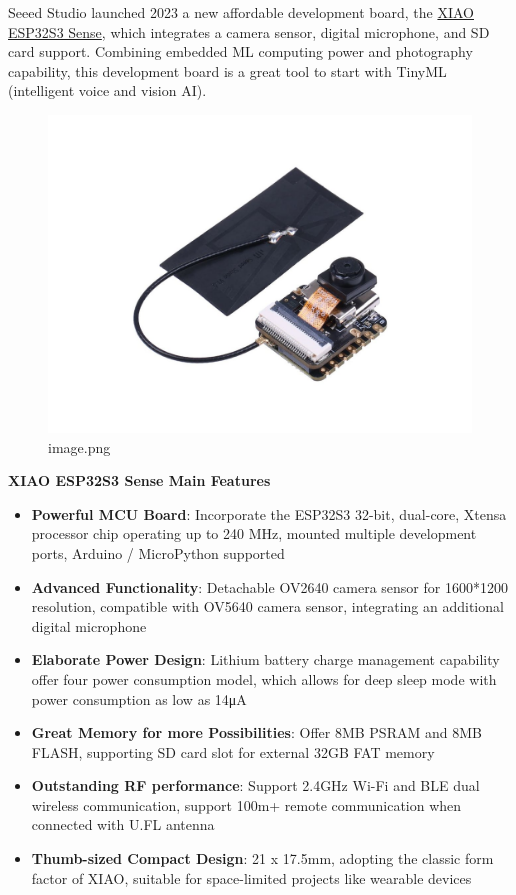 \documentclass[
  letterpaper,
  DIV=11,
  numbers=noendperiod]{scrreprt}
\providecommand{\tightlist}{%
  \setlength{\itemsep}{0pt}\setlength{\parskip}{0pt}}\usepackage{longtable,booktabs,array}
\begin{document}

Seeed Studio launched 2023 a new affordable development board, the
\href{https://www.seeedstudio.com/XIAO-ESP32S3-Sense-p-5639.html}{XIAO
ESP32S3 Sense}, which integrates a camera sensor, digital microphone,
and SD card support. Combining embedded ML computing power and
photography capability, this development board is a great tool to start
with TinyML (intelligent voice and vision AI).

\begin{figure}[H]

{\centering \includegraphics{images/imgs_esp32s3_setup/1.jpeg}

}

\caption{image.png}

\end{figure}

\textbf{XIAO ESP32S3 Sense Main Features}

\begin{itemize}
\tightlist
\item
  \textbf{Powerful MCU Board}: Incorporate the ESP32S3 32-bit,
  dual-core, Xtensa processor chip operating up to 240 MHz, mounted
  multiple development ports, Arduino / MicroPython supported
\item
  \textbf{Advanced Functionality}: Detachable OV2640 camera sensor for
  1600*1200 resolution, compatible with OV5640 camera sensor,
  integrating an additional digital microphone
\item
  \textbf{Elaborate Power Design}: Lithium battery charge management
  capability offer four power consumption model, which allows for deep
  sleep mode with power consumption as low as 14μA
\item
  \textbf{Great Memory for more Possibilities}: Offer 8MB PSRAM and 8MB
  FLASH, supporting SD card slot for external 32GB FAT memory
\item
  \textbf{Outstanding RF performance}: Support 2.4GHz Wi-Fi and BLE dual
  wireless communication, support 100m+ remote communication when
  connected with U.FL antenna
\item
  \textbf{Thumb-sized Compact Design}: 21 x 17.5mm, adopting the classic
  form factor of XIAO, suitable for space-limited projects like wearable
  devices
\end{itemize}
\end{document}
